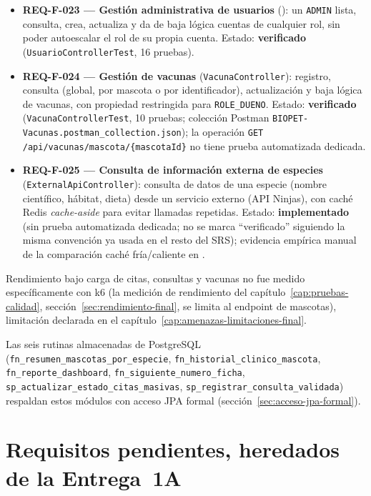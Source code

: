 \begin{itemize}[nosep]
  \item \textbf{REQ-F-023 --- Gesti\'on administrativa de usuarios}
    (): un
    \texttt{ADMIN} lista, consulta, crea, actualiza y da de baja l\'ogica
    cuentas de cualquier rol, sin poder autoescalar el rol de su propia
    cuenta. Estado: \textbf{verificado} (\texttt{UsuarioControllerTest},
    16 pruebas).
  \item \textbf{REQ-F-024 --- Gesti\'on de vacunas} (\texttt{VacunaController}):
    registro, consulta (global, por mascota o por identificador),
    actualizaci\'on y baja l\'ogica de vacunas, con propiedad restringida
    para \texttt{ROLE\_DUENO}. Estado: \textbf{verificado}
    (\texttt{VacunaControllerTest}, 10 pruebas; colecci\'on Postman
    \texttt{BIOPET-Vacunas.postman\_collection.json}); la operaci\'on
    \texttt{GET /api/vacunas/mascota/\{mascotaId\}} no tiene prueba
    automatizada dedicada.
  \item \textbf{REQ-F-025 --- Consulta de informaci\'on externa de especies}
    (\texttt{External\allowbreak ApiController}): consulta de datos de una especie
    (nombre cient\'ifico, h\'abitat, dieta) desde un servicio externo (API
    Ninjas), con cach\'e Redis \emph{cache-aside} para evitar llamadas
    repetidas. Estado: \textbf{implementado} (sin prueba automatizada
    dedicada; no se marca ``verificado'' siguiendo la misma convenci\'on ya
    usada en el resto del SRS); evidencia emp\'irica manual de la
    comparaci\'on cach\'e fr\'ia/caliente en
    .
\end{itemize}

Rendimiento bajo carga de citas, consultas y vacunas no fue medido
espec\'ificamente con k6 (la medici\'on de rendimiento del
cap\'itulo~\ref{cap:pruebas-calidad}, secci\'on~\ref{sec:rendimiento-final},
se limita al endpoint de mascotas), limitaci\'on declarada en el
cap\'itulo~\ref{cap:amenazas-limitaciones-final}.

Las seis rutinas almacenadas de PostgreSQL (\texttt{fn\_resumen\_mascotas\_por\_especie},
\texttt{fn\_historial\_clinico\_mascota}, \texttt{fn\_reporte\_dashboard},
\texttt{fn\_siguiente\_numero\_ficha}, \texttt{sp\_actualizar\_estado\_citas\_masivas},
\texttt{sp\_registrar\_consulta\_validada}) respaldan estos m\'odulos con
acceso JPA formal (secci\'on~\ref{sec:acceso-jpa-formal}).

\section{Requisitos pendientes, heredados de la Entrega~1A}

